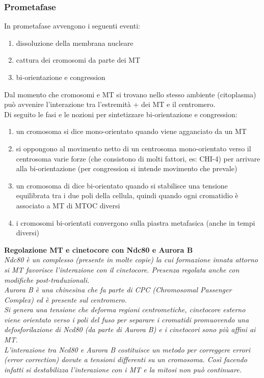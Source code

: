         \subsubsection{Prometafase}
            In prometafase avvengono i seguenti eventi:
            \begin{enumerate}
                \item dissoluzione della membrana nucleare
                \item cattura dei cromosomi da parte dei MT
                \item bi-orientazione e congression
            \end{enumerate}
            Dal momento che cromosomi e MT si trovano nello stesso ambiente (citoplasma) può avvenire l’interazione tra l’estremità + dei MT e il centromero.\\
            Di seguito le fasi e le nozioni per sintetizzare bi-orientazione e congression:
            \begin{enumerate}
                \item un cromosoma si dice mono-orientato quando viene agganciato da un MT
                \item si oppongono al movimento netto di un centrosoma mono-orientato verso il centrosoma varie forze (che consistono di molti fattori, es: CHI-4) per arrivare alla bi-orientazione (per congression si intende movimento che prevale)
                \item un cromosoma di dice bi-orientato quando si stabilisce una tensione equilibrata tra i due poli della cellula, quindi quando ogni cromatidio è associato a MT di MTOC diversi
                \item i cromosomi bi-orientati convergono sulla piastra metafasica (anche in tempi diversi)
            \end{enumerate}
            
            \textbf{Regolazione MT e cinetocore con Ndc80 e Aurora B}\\
            \textit{Ndc80 è un complesso (presente in molte copie) la cui formazione innata attorno si MT favorisce l’interazione con il cinetocore. Presenza regolata anche con modifiche post-traduzionali.\\
            Aurora B è una chinesina che fa parte di CPC (Chromosomal Passenger Complex) ed è presente sul centromero. \\
            Si genera una tensione che deforma regioni centrometiche, cinetocore esterno viene orientato verso i poli del fuso per separare i cromatidi promuovendo una defosforilazione di Ncd80 (da parte di Aurora B) e i cinetocori sono più affini ai MT.\\
            L’interazione tra Ncd80 e Aurora B costituisce un metodo per correggere errori (error correction) dovute a tensioni differenti su un cromosoma. Così facendo infatti si destabilizza l’interazione con i MT e la mitosi non può continuare.}
